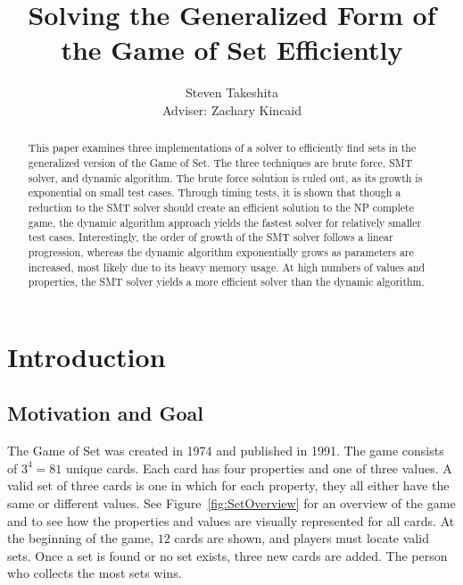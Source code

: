 \documentclass[pageno]{jpaper}
\begin{document}
\title{Solving the Generalized Form of the Game of Set Efficiently}

\author{Steven Takeshita\\Adviser: Zachary Kincaid}

\date{}
\maketitle

\thispagestyle{empty}
\doublespacing
\begin{abstract}
This paper examines three implementations of a solver to efficiently find sets in the generalized version of the Game of Set. The three techniques are brute force, SMT solver, and dynamic algorithm. The brute force solution is ruled out, as its growth is exponential on small test cases. Through timing tests, it is shown that though a reduction to the SMT solver should create an efficient solution to the NP complete game, the dynamic algorithm approach yields the fastest solver for relatively smaller test cases. Interestingly, the order of growth of the SMT solver follows a linear progression, whereas the dynamic algorithm exponentially grows as parameters are increased, most likely due to its heavy memory usage. At high numbers of values and properties, the SMT solver yields a more efficient solver than the dynamic algorithm. 
\end{abstract}

\section{Introduction}

\subsection{Motivation and Goal}

The Game of Set was created in 1974 and published in 1991. The game consists of $3^4 = 81$ unique cards. Each card has four properties and one of three values. A valid set of three cards is one in which for each property, they all either have the same or different values. See Figure~\ref{fig:SetOverview} for an overview of the game and to see how the properties and values are visually represented for all cards. At the beginning of the game, $12$ cards are shown, and players must locate valid sets. Once a set is found or no set exists, three new cards are added. The person who collects the most sets wins. 
\end{document}
